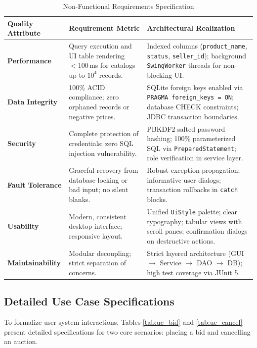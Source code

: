 \begin{table}[H]
\centering
\small
\caption{Non-Functional Requirements Specification}
\label{tab:nfr_summary}
\begin{tabularx}{\textwidth}{p{3.2cm}p{4cm}X}
\toprule
\textbf{Quality Attribute} & \textbf{Requirement Metric} & \textbf{Architectural Realization} \\
\midrule
\textbf{Performance} & Query execution and UI table rendering $< 100$\,ms for catalogs up to $10^4$ records. & Indexed columns (\texttt{product\_name}, \texttt{status}, \texttt{seller\_id}); background \texttt{SwingWorker} threads for non-blocking UI. \\
\addlinespace
\textbf{Data Integrity} & 100\% ACID compliance; zero orphaned records or negative prices. & SQLite foreign keys enabled via \texttt{PRAGMA foreign\_keys = ON}; database CHECK constraints; JDBC transaction boundaries. \\
\addlinespace
\textbf{Security} & Complete protection of credentials; zero SQL injection vulnerability. & PBKDF2 salted password hashing; 100\% parameterized SQL via \texttt{PreparedStatement}; role verification in service layer. \\
\addlinespace
\textbf{Fault Tolerance} & Graceful recovery from database locking or bad input; no silent blanks. & Robust exception propagation; informative user dialogs; transaction rollbacks in \texttt{catch} blocks. \\
\addlinespace
\textbf{Usability} & Modern, consistent desktop interface; responsive layout. & Unified \texttt{UiStyle} palette; clear typography; tabular views with scroll panes; confirmation dialogs on destructive actions. \\
\addlinespace
\textbf{Maintainability} & Modular decoupling; strict separation of concerns. & Strict layered architecture (GUI $\rightarrow$ Service $\rightarrow$ DAO $\rightarrow$ DB); high test coverage via JUnit 5. \\
\bottomrule
\end{tabularx}
\end{table}

\subsection{Detailed Use Case Specifications}
To formalize user-system interactions, Tables \ref{tab:uc_bid} and \ref{tab:uc_cancel} present detailed specifications for two core scenarios: placing a bid and cancelling an auction.

